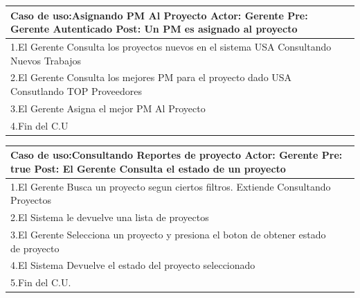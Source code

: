 \begin{longtable}{|p{}|p{}|}
    \hline
    \multicolumn{2}{|p{16cm}|}{
        \textbf{Caso de uso:}Asignando PM Al Proyecto\newline
        \textbf{Actor:} Gerente\newline
        \textbf{Pre: }Gerente Autenticado\newline
        \textbf{Post:} Un PM es asignado al proyecto
    }\\
    \hline
    1.El Gerente Consulta los proyectos nuevos en el sistema USA Consultando Nuevos Trabajos&    \\
    \hline
    2.El Gerente Consulta los mejores PM para el proyecto dado USA Consutlando TOP Proveedores& \\
    \hline
    3.El Gerente Asigna el mejor PM Al Proyecto&\\
    \hline
    4.Fin del C.U&\\
    \hline
\end{longtable}


\begin{longtable}{|p{}|p{}|}
    \hline
    \multicolumn{2}{|p{16cm}|}{
        \textbf{Caso de uso:}Consultando Reportes de proyecto\newline
        \textbf{Actor:} Gerente\newline
        \textbf{Pre: }true\newline
        \textbf{Post:}  El Gerente Consulta el estado de un proyecto
    }\\
    \hline
    1.El Gerente Busca un proyecto segun ciertos filtros. Extiende Consultando Proyectos&    \\
    \hline
    2.El Sistema le devuelve una lista de proyectos& \\
    \hline
    3.El Gerente Selecciona un proyecto y presiona el boton de obtener estado de proyecto&\\
    \hline
    4.El Sistema Devuelve el estado del proyecto seleccionado &\\
    \hline
    5.Fin del C.U.&\\
    \hline
\end{longtable}

